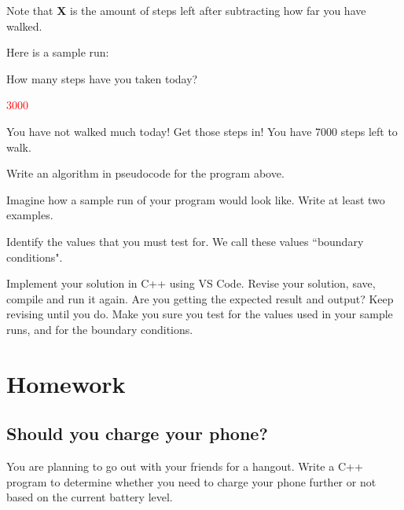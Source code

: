 Note that \textbf{X} is the amount of steps left after subtracting how far you have walked. 

Here is a sample run:

\begin{sample}
How many steps have you taken today?

\textcolor{red}{3000}

You have not walked much today! Get those steps in! You have 7000 steps left to walk.
\end{sample}

\begin{multipart}
    Write an algorithm in pseudocode for the program above.
\end{multipart}

\vspace{4cm}

\begin{multipart}
     Imagine how a sample run of your program would look like. Write at least two examples.
\end{multipart}

\vspace{4cm}

\begin{multipart}
    Identify the values that you must test for. We call these values ``boundary conditions".
\end{multipart}

\vspace{4cm}

\begin{multipart}
    Implement your solution in C++ using VS Code. Revise your solution, save, compile and run it again. Are you getting the expected result and output? Keep revising until you do. Make you sure you test for the values used in your sample runs, and for the boundary conditions. 
\end{multipart}

\section{Homework}

\subsection{Should you charge your phone?}

You are planning to go out with your friends for a hangout. Write a C++ program to determine whether you need to charge your phone further or not based on the current battery level.\\

